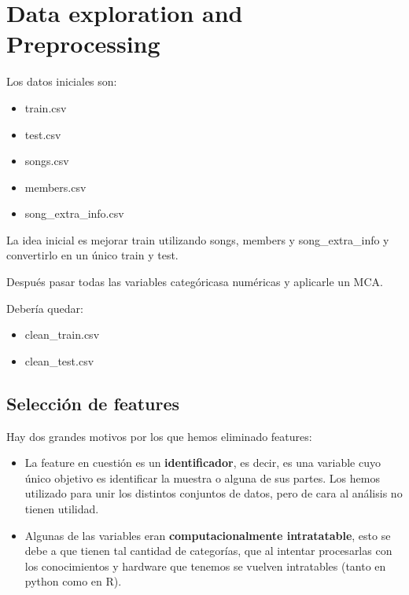 \documentclass[a4paper]{article}
\begin{document}


\section{Data exploration and Preprocessing}

Los datos iniciales son: 
\begin{itemize}
\item train.csv
\item test.csv
\item songs.csv
\item members.csv
\item song\_extra\_info.csv
\end{itemize}

La idea inicial es mejorar train utilizando songs, members y song\_extra\_info y convertirlo en un único train y test. 

Después pasar todas las variables categóricasa numéricas y aplicarle un MCA.

Debería quedar: 
\begin{itemize}
\item clean\_train.csv
\item clean\_test.csv
\end{itemize}

\subsection{Selección de features}

Hay dos grandes motivos por los que hemos eliminado features: 

\begin{itemize}
\item La feature en cuestión es un \textbf{identificador}, es decir, es una variable cuyo único objetivo es identificar la muestra o alguna de sus partes. Los hemos utilizado para unir los distintos conjuntos de datos, pero de cara al análisis no tienen utilidad.
\item Algunas de las variables eran \textbf{computacionalmente intratatable}, esto se debe a que tienen tal cantidad de categorías, que al intentar procesarlas con los conocimientos y hardware que tenemos se vuelven intratables (tanto en python como en R).
\end{itemize}
\end{document}

